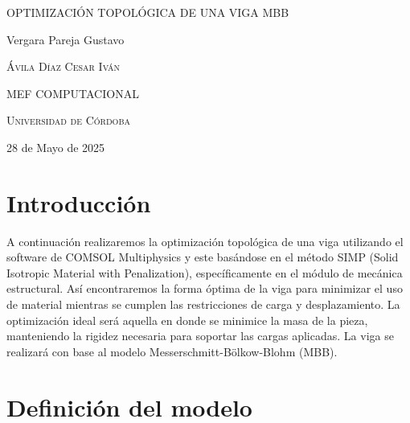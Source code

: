 \documentclass{article}
\author{Gustavo Vergara}
\theoremstyle{mytheoremstyle}
\theoremstyle{mytheoremstyle}
\theoremstyle{myproblemstyle}
\begin{document}

\begin{titlepage}
    \centering
    \vspace{2.5cm}
    {\scshape \Large OPTIMIZACIÓN TOPOLÓGICA DE UNA VIGA MBB\par}
    \vspace{5cm}
    \textbf\large\scshape{\par}
    \vspace{0.5cm}
    {\Large Vergara Pareja Gustavo\par}
    \vspace{5cm}
    {\scshape\Large Ávila Díaz Cesar Iván\par}
    \vspace{0.3cm}
    {\scshape\Large MEF COMPUTACIONAL \par}
    \vspace{0.3cm}
    {\scshape\Large Universidad de Córdoba\par}
    \vspace{0.3cm}
    {\Large 28 de Mayo de 2025 \par}
\end{titlepage}
\tableofcontents
\newpage
\section{Introducción}

    A continuación realizaremos la optimización topológica de una viga utilizando el software de COMSOL Multiphysics y este basándose en el método SIMP (Solid Isotropic Material with Penalization), específicamente en el módulo de mecánica estructural. Así encontraremos la forma óptima de la viga para minimizar el uso de material mientras se cumplen las restricciones de carga y desplazamiento. La optimización ideal será aquella en donde se minimice la masa de la pieza, manteniendo la rigidez necesaria para soportar las cargas aplicadas. La viga se realizará con base al modelo Messerschmitt-Bölkow-Blohm (MBB).

\section{Definición del modelo}
   
\end{document}
